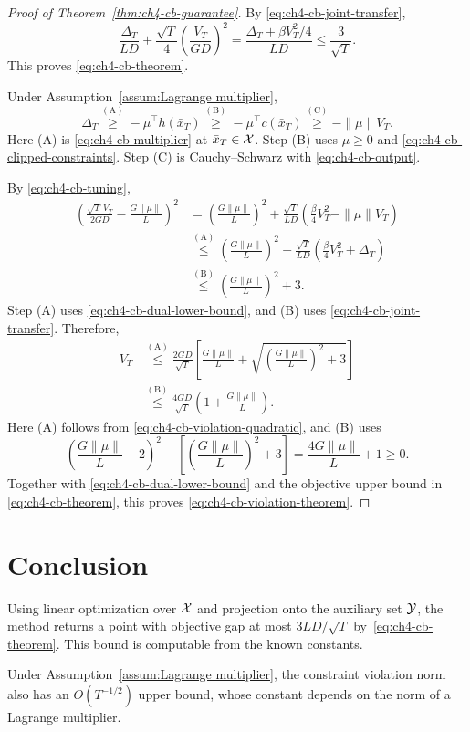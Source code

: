 \begin{proof}[Proof of Theorem~\ref{thm:ch4-cb-guarantee}]
By \eqref{eq:ch4-cb-joint-transfer},
\[
\frac{\Delta_T}{LD}
+\frac{\sqrt T}{4}\left(\frac{V_T}{GD}\right)^2
=\frac{\Delta_T+\beta V_T^2/4}{LD}
\le\frac3{\sqrt T}.
\]
This proves \eqref{eq:ch4-cb-theorem}.

Under Assumption~\ref{assum:Lagrange multiplier},
\begin{equation}\label{eq:ch4-cb-dual-lower-bound}
\Delta_T
\overset{\mathrm{(A)}}{\ge}-\mu^\top h(\bar x_T)
\overset{\mathrm{(B)}}{\ge}-\mu^\top c(\bar x_T)
\overset{\mathrm{(C)}}{\ge}-\|\mu\|V_T.
\end{equation}
\nopagebreak[3]
Here (A) is \eqref{eq:ch4-cb-multiplier} at $\bar x_T\in\mathcal{X}$.
Step (B) uses $\mu\ge0$ and \eqref{eq:ch4-cb-clipped-constraints}.
Step (C) is Cauchy--Schwarz with
\eqref{eq:ch4-cb-output}.

By \eqref{eq:ch4-cb-tuning},
\begin{equation}\label{eq:ch4-cb-violation-quadratic}
\begin{aligned}
\left(\frac{\sqrt T\,V_T}{2GD}-\frac{G\|\mu\|}{L}\right)^2
&=\left(\frac{G\|\mu\|}{L}\right)^2
+\frac{\sqrt T}{LD}\left(\frac\beta4V_T^2-\|\mu\|V_T\right)\\
&\overset{\mathrm{(A)}}{\le}\left(\frac{G\|\mu\|}{L}\right)^2
+\frac{\sqrt T}{LD}\left(\frac\beta4V_T^2+\Delta_T\right)\\
&\overset{\mathrm{(B)}}{\le}\left(\frac{G\|\mu\|}{L}\right)^2+3.
\end{aligned}
\end{equation}
\nopagebreak[3]
Step (A) uses \eqref{eq:ch4-cb-dual-lower-bound}, and (B) uses
\eqref{eq:ch4-cb-joint-transfer}.
Therefore,
\[
\begin{aligned}
V_T
&\overset{\mathrm{(A)}}{\le}\frac{2GD}{\sqrt T}
\left[\frac{G\|\mu\|}{L}
+\sqrt{\left(\frac{G\|\mu\|}{L}\right)^2+3}\right]\\
&\overset{\mathrm{(B)}}{\le}\frac{4GD}{\sqrt T}
\left(1+\frac{G\|\mu\|}{L}\right).
\end{aligned}
\]
\nopagebreak[3]
Here (A) follows from \eqref{eq:ch4-cb-violation-quadratic}, and (B) uses
\[
\left(\frac{G\|\mu\|}{L}+2\right)^2
-\left[\left(\frac{G\|\mu\|}{L}\right)^2+3\right]
=\frac{4G\|\mu\|}{L}+1\ge0.
\]
Together with \eqref{eq:ch4-cb-dual-lower-bound} and the objective upper
bound in \eqref{eq:ch4-cb-theorem}, this proves
\eqref{eq:ch4-cb-violation-theorem}.
\end{proof}

\section{Conclusion}

Using linear optimization over $\mathcal{X}$ and projection onto the auxiliary
set $\mathcal{Y}$, the method returns a point with objective gap at most
$3LD/\sqrt T$ by~\eqref{eq:ch4-cb-theorem}. This bound is computable from
the known constants.

Under Assumption~\ref{assum:Lagrange multiplier}, the constraint violation
norm also has an $O(T^{-1/2})$ upper bound, whose constant depends on
the norm of a Lagrange multiplier.
